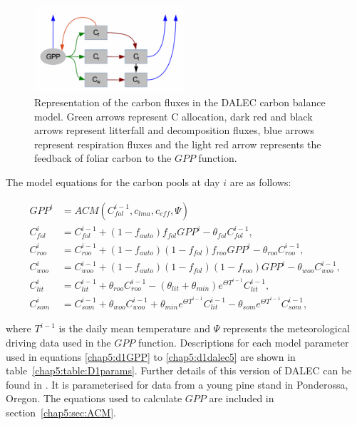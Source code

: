 \begin{figure}[ht]
    \centering
    \includegraphics[width=0.5\textwidth]{chapter/chapter5/DALECpic.png}
    \caption{Representation of the carbon fluxes in the DALEC carbon balance model. Green arrows represent C allocation, dark red and black arrows represent litterfall and decomposition fluxes, blue arrows represent respiration fluxes and the light red arrow represents the feedback of foliar carbon to the $GPP$ function. \cite{delahaies2013regularization}}
    \label{fig:DALEC_mod}
\end{figure}

The model equations for the carbon pools at day $i$ are as follows:

\begin{align}
GPP^{i} &= ACM(C_{fol}^{i-1}, c_{lma}, c_{eff}, \Psi) \label{chap5:d1GPP}
\\C_{fol}^{i}&=C_{fol}^{i-1}+(1-f_{auto})f_{fol}GPP^{i}-\theta_{fol}C_{fol}^{i-1},
\\C_{roo}^{i}&=C_{roo}^{i-1}+(1-f_{auto})(1-f_{fol})f_{roo}GPP^{i}-\theta_{roo}C_{roo}^{i-1}, 
\\C_{woo}^{i}&=C_{woo}^{i-1}+(1-f_{auto})(1-f_{fol})(1-f_{roo})GPP^{i}-\theta_{woo}C_{woo}^{i-1}, 
\\C_{lit}^{i}&=C_{lit}^{i-1}+\theta_{roo}C_{roo}^{i-1}-(\theta_{lit}+\theta_{min})e^{\Theta T^{i-1}}C_{lit}^{i-1}, 
\\C_{som}^{i}&=C_{som}^{i-1}+\theta_{woo}C_{woo}^{i-1}+\theta_{min}e^{\Theta T^{i-1}}C_{lit}^{i-1}-\theta_{som}e^{\Theta T^{i-1}}C_{som}^{i-1}, \label{chap5:d1dalec5}
\end{align}

where $T^{i-1}$ is the daily mean temperature and $\Psi$ represents the meteorological driving data used in the $GPP$ function. Descriptions for each model parameter used in equations \eqref{chap5:d1GPP} to \eqref{chap5:d1dalec5} are shown in table~\ref{chap5:table:D1params}. Further details of this version of DALEC can be found in \cite{williams2005improved}. It is parameterised for data from a young pine stand in Ponderossa, Oregon. The equations used to calculate $GPP$ are included in section~\ref{chap5:sec:ACM}. 

